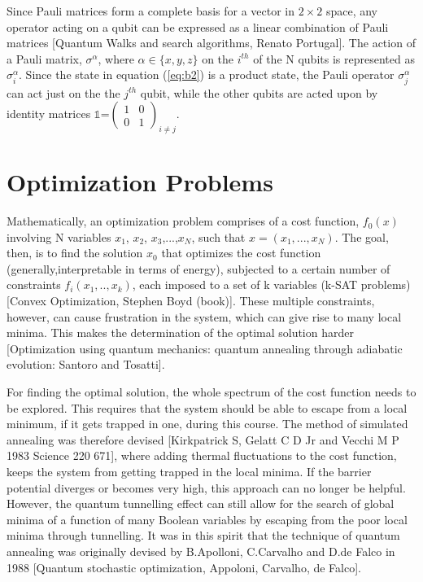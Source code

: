 \documentclass[12]{article}
\begin{document}
Since Pauli matrices form a complete basis for a vector in $2 \times 2$ space, any operator acting on a qubit can be expressed as a linear combination of Pauli matrices [Quantum Walks and search algorithms, Renato Portugal]. The action of a Pauli matrix, $\sigma^\alpha$, where $\alpha \in \{x,y,z\}$ on the $i^{th}$ of the N qubits is represented as $\sigma_i^\alpha$. Since the state in equation (\ref{eq:b2}) is a product state, the Pauli operator $\sigma_j^\alpha$ can act just on the the $j^{th}$ qubit, while the other qubits are acted upon by identity matrices $\mathbb{1}$=$\begin{pmatrix}
1&0\\
0&1
\end{pmatrix}_{i \neq j}
$.\\
\section{Optimization Problems}
Mathematically, an optimization problem comprises of a cost function, $f_0(x)$ involving N variables $x_1$, $x_2$, $x_3$,...,$x_N$, such that $x=(x_1,...,x_N)$. The goal, then, is to find the solution $x_0$ that optimizes the cost function (generally,interpretable in terms of energy), subjected to a certain number of constraints $f_i(x_1,..,x_k)$, each imposed to a set of k variables (k-SAT problems)[Convex Optimization, Stephen Boyd (book)]. These multiple constraints, however, can cause frustration in the system, which can give rise to many local minima. This makes the determination of the optimal solution harder [Optimization using quantum mechanics: quantum annealing through adiabatic evolution: Santoro and Tosatti].

For finding the optimal solution, the whole spectrum of the cost function needs to be explored. This requires that the system should be able to escape from a local minimum, if it gets trapped in one, during this course. The method of simulated annealing was therefore devised [Kirkpatrick S, Gelatt C D Jr and Vecchi M P 1983 Science 220 671], where adding thermal fluctuations to the cost function, keeps the system from getting trapped in the local minima. If the barrier potential diverges or becomes very high, this approach can no longer be helpful. However, the quantum tunnelling effect can still allow for the search of global minima of a function of many Boolean variables by escaping from the poor local minima through tunnelling. It was in this spirit that the technique of quantum annealing was originally devised by B.Apolloni, C.Carvalho and D.de Falco in 1988 [Quantum stochastic optimization, Appoloni, Carvalho, de Falco].
\end{document}
